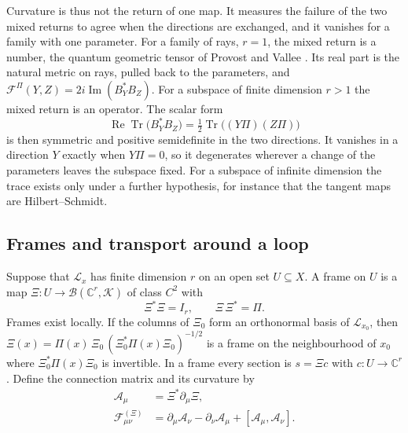 \documentclass[11pt]{article}
\theoremstyle{definition}
\DeclareMathOperator{\Tr}{Tr}
\newcommand{\C}{\mathbb C}
\begin{document}
Curvature is thus not the return of one map. It measures the failure of the two mixed returns to agree when the directions are exchanged, and it vanishes for a family with one parameter. For a family of rays, $r=1$, the mixed return is a number, the quantum geometric tensor of Provost and Vallee \cite{ProvostVallee1980}. Its real part is the natural metric on rays, pulled back to the parameters, and $\mathcal F^\Pi(Y,Z)=2i\operatorname{Im}(B_Y^*B_Z)$. For a subspace of finite dimension $r>1$ the mixed return is an operator. The scalar form
\begin{equation}
 \operatorname{Re}\Tr\bigl(B_Y^*B_Z\bigr)=\tfrac12\Tr\bigl((Y\Pi)(Z\Pi)\bigr)
 \label{eq:moving-scalar-form}
\end{equation}
is then symmetric and positive semidefinite in the two directions. It vanishes in a direction $Y$ exactly when $Y\Pi=0$, so it degenerates wherever a change of the parameters leaves the subspace fixed. For a subspace of infinite dimension the trace exists only under a further hypothesis, for instance that the tangent maps are Hilbert--Schmidt.

\subsection{Frames and transport around a loop}
\label{subsec:moving-frames}

Suppose that $\mathcal L_x$ has finite dimension $r$ on an open set $U\subseteq X$. A frame on $U$ is a map $\Xi:U\to\mathcal B(\C^r,\mathcal K)$ of class $C^2$ with
\begin{equation}
 \Xi^*\Xi=I_r,\qquad \Xi\,\Xi^*=\Pi .
 \label{eq:moving-frame}
\end{equation}
Frames exist locally. If the columns of $\Xi_0$ form an orthonormal basis of $\mathcal L_{x_0}$, then $\Xi(x)=\Pi(x)\,\Xi_0\,(\Xi_0^*\Pi(x)\Xi_0)^{-1/2}$ is a frame on the neighbourhood of $x_0$ where $\Xi_0^*\Pi(x)\Xi_0$ is invertible. In a frame every section is $s=\Xi c$ with $c:U\to\C^r$. Define the connection matrix and its curvature by
\begin{align}
 \mathcal A_\mu&=\Xi^*\partial_\mu\Xi ,
 \label{eq:moving-connection-matrix}\\
 \mathcal F^{(\Xi)}_{\mu\nu}&=\partial_\mu\mathcal A_\nu-\partial_\nu\mathcal A_\mu+[\mathcal A_\mu,\mathcal A_\nu].
 \label{eq:moving-frame-curvature}
\end{align}
\end{document}
